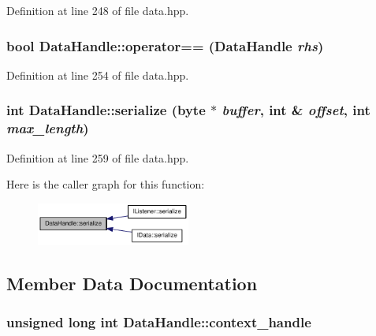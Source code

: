 Definition at line 248 of file data.hpp.\hypertarget{struct_data_handle_a90328ac319872e9b491f118f9a5a6ab8}{
\subsubsection[{operator==}]{\setlength{\rightskip}{0pt plus 5cm}bool DataHandle::operator== ({\bf DataHandle} {\em rhs})}}
\label{struct_data_handle_a90328ac319872e9b491f118f9a5a6ab8}


Definition at line 254 of file data.hpp.\hypertarget{struct_data_handle_a5a107dc8166953db8bb7de3e1a74391f}{
\subsubsection[{serialize}]{\setlength{\rightskip}{0pt plus 5cm}int DataHandle::serialize ({\bf byte} $\ast$ {\em buffer}, \/  int \& {\em offset}, \/  int {\em max\_\-length})}}
\label{struct_data_handle_a5a107dc8166953db8bb7de3e1a74391f}


Definition at line 259 of file data.hpp.

Here is the caller graph for this function:\nopagebreak
\begin{figure}[H]
\begin{center}
\leavevmode
\includegraphics[width=143pt]{struct_data_handle_a5a107dc8166953db8bb7de3e1a74391f_icgraph}
\end{center}
\end{figure}


\subsection{Member Data Documentation}
\hypertarget{struct_data_handle_a85a5c067d1fa51712432b28feefe7d2f}{
\subsubsection[{context\_\-handle}]{\setlength{\rightskip}{0pt plus 5cm}unsigned long int {\bf DataHandle::context\_\-handle}}}
\label{struct_data_handle_a85a5c067d1fa51712432b28feefe7d2f}


